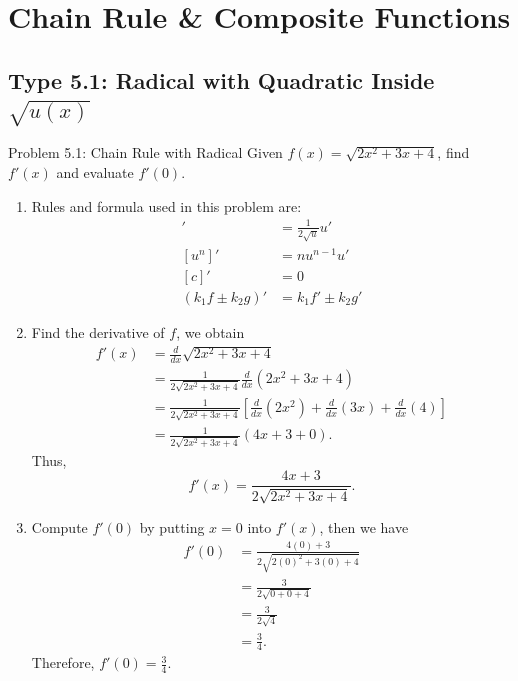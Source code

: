 \documentclass[11pt,a4paper]{article}
\begin{document}
\newpage
\section{Chain Rule \& Composite Functions}

\subsection{Type 5.1: Radical with Quadratic Inside $\sqrt{u(x)}$}
\begin{problembox}{Problem 5.1: Chain Rule with Radical}
Given $f(x) = \sqrt{2x^2 + 3x + 4}$, find $f'(x)$ and evaluate $f'(0)$.
\end{problembox}
\begin{solutionbox}
\begin{enumerate}
	\item [Step 1.] Rules and formula used in this problem are:
	\begin{align*}
		[\sqrt{u}]' &= \frac{1}{2\sqrt{u}} u' \\
		[u^n]' &= n u^{n-1} u' \\
		[c]' &= 0 \\
		(k_1f \pm k_2 g)' &= k_1f' \pm k_2g'
	\end{align*}
	
	\item [Step 2.] Find the derivative of $f$, we obtain
	\begin{align*}
		f'(x) &= \frac{d}{dx} \sqrt{2x^2 + 3x + 4} \\
		&= \frac{1}{2\sqrt{2x^2 + 3x + 4}} \frac{d}{dx} (2x^2 + 3x + 4) \\
		&= \frac{1}{2\sqrt{2x^2 + 3x + 4}} \left[ \frac{d}{dx}(2x^2) + \frac{d}{dx}(3x) + \frac{d}{dx}(4) \right] \\
		&= \frac{1}{2\sqrt{2x^2 + 3x + 4}} (4x + 3 + 0).
	\end{align*}
	Thus,
	\begin{equation*}
		f'(x) = \frac{4x + 3}{2\sqrt{2x^2 + 3x + 4}}.
	\end{equation*}
	
	\item [Step 3.] Compute $f'(0)$ by putting $x = 0$ into $f'(x)$, then we have
	\begin{align*}
		f'(0) &= \frac{4(0) + 3}{2\sqrt{2(0)^2 + 3(0) + 4}} \\
		&= \frac{3}{2\sqrt{0 + 0 + 4}} \\
		&= \frac{3}{2\sqrt{4}} \\
		&= \frac{3}{4}.
	\end{align*}
	Therefore, $f'(0) = \frac{3}{4}$.
\end{enumerate}
\end{solutionbox}
\end{document}
